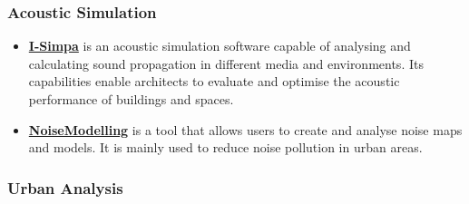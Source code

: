 \documentclass[a4paper, 12pt]{report}
\begin{document}
\subsubsection{Acoustic Simulation}\label{subsec:acoustic-simulation}

\begin{itemize}

\item \href{https://github.com/Universite-Gustave-Eiffel/I-Simpa}{\textbf{I-Simpa}} is an acoustic simulation software capable of analysing and calculating sound propagation in different media and environments. Its capabilities enable architects to evaluate and optimise the acoustic performance of buildings and spaces.

\item \href{https://github.com/Universite-Gustave-Eiffel/NoiseModelling}{\textbf{NoiseModelling}} is a tool that allows users to create and analyse noise maps and models. It is mainly used to reduce noise pollution in urban areas.

\end{itemize}

\subsubsection{Urban Analysis}\label{subsec:urban-analysis}
\end{document}

